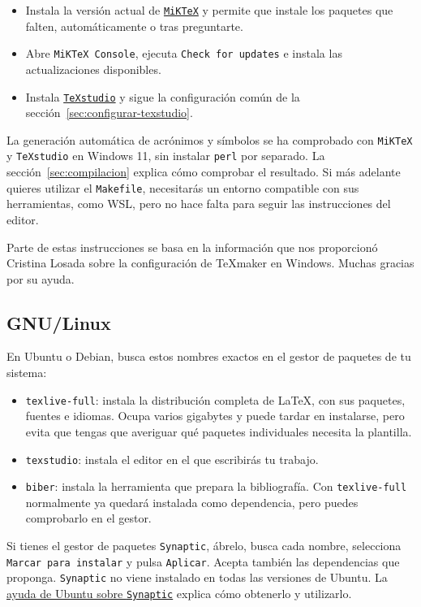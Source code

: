 \begin{itemize}
  \item Instala la versión actual de \href{https://miktex.org/download}{\texttt{MiKTeX}} y permite que instale los paquetes que falten, automáticamente o tras preguntarte.
  \item Abre \texttt{MiKTeX Console}, ejecuta \texttt{Check for updates} e instala las actualizaciones disponibles.
  \item Instala \href{https://www.texstudio.org/}{\texttt{TeXstudio}} y sigue la configuración común de la sección~\ref{sec:configurar-texstudio}.
\end{itemize}

La generación automática de acrónimos y símbolos se ha comprobado con \texttt{MiKTeX} y \texttt{TeXstudio} en Windows 11, sin instalar \texttt{perl} por separado. La sección~\ref{sec:compilacion} explica cómo comprobar el resultado. Si más adelante quieres utilizar el \texttt{Makefile}, necesitarás un entorno compatible con sus herramientas, como WSL, pero no hace falta para seguir las instrucciones del editor.

Parte de estas instrucciones se basa en la información que nos proporcionó Cristina Losada sobre la configuración de TeXmaker en Windows. Muchas gracias por su ayuda.

\subsection{GNU/Linux}

En Ubuntu o Debian, busca estos nombres exactos en el gestor de paquetes de tu sistema:

\begin{itemize}
  \item \texttt{texlive-full}: instala la distribución completa de \LaTeX{}, con sus paquetes, fuentes e idiomas. Ocupa varios gigabytes y puede tardar en instalarse, pero evita que tengas que averiguar qué paquetes individuales necesita la plantilla.
  \item \texttt{texstudio}: instala el editor en el que escribirás tu trabajo.
  \item \texttt{biber}: instala la herramienta que prepara la bibliografía. Con \texttt{texlive-full} normalmente ya quedará instalada como dependencia, pero puedes comprobarlo en el gestor.
\end{itemize}

Si tienes el gestor de paquetes \texttt{Synaptic}, ábrelo, busca cada nombre, selecciona \texttt{Marcar para instalar} y pulsa \texttt{Aplicar}. Acepta también las dependencias que proponga. \texttt{Synaptic} no viene instalado en todas las versiones de Ubuntu. La \href{https://help.ubuntu.com/stable/ubuntu-help/addremove-install-synaptic.html.en}{ayuda de Ubuntu sobre \texttt{Synaptic}} explica cómo obtenerlo y utilizarlo.

